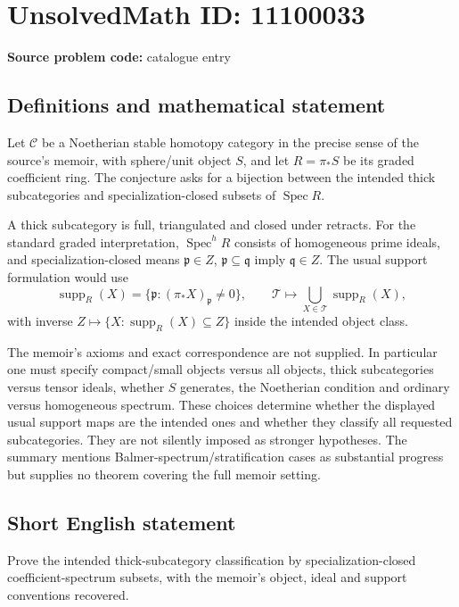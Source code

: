 \documentclass[11pt]{article}
\begin{document}
\section*{UnsolvedMath ID: 11100033}
\textbf{Source problem code:} catalogue entry
\subsection{Definitions and mathematical statement}
Let \(\mathcal C\) be a Noetherian stable homotopy category in the precise sense of the source's memoir, with sphere/unit object \(S\), and let \(R=\pi_*S\) be its graded coefficient ring. The conjecture asks for a bijection between the intended thick subcategories and specialization-closed subsets of \(\operatorname{Spec}R\).

A thick subcategory is full, triangulated and closed under retracts. For the standard graded interpretation, \(\operatorname{Spec}^hR\) consists of homogeneous prime ideals, and specialization-closed means \(\mathfrak p\in Z\), \(\mathfrak p\subseteq\mathfrak q\) imply \(\mathfrak q\in Z\). The usual support formulation would use
\[
 \operatorname{supp}_R(X)=\{\mathfrak p:(\pi_*X)_{\mathfrak p}\ne0\},
 \qquad
 \mathcal T\longmapsto\bigcup_{X\in\mathcal T}\operatorname{supp}_R(X),
\]
with inverse \(Z\mapsto\{X:\operatorname{supp}_R(X)\subseteq Z\}\) inside the intended object class.

The memoir's axioms and exact correspondence are not supplied. In particular one must specify compact/small objects versus all objects, thick subcategories versus tensor ideals, whether \(S\) generates, the Noetherian condition and ordinary versus homogeneous spectrum. These choices determine whether the displayed usual support maps are the intended ones and whether they classify all requested subcategories. They are not silently imposed as stronger hypotheses. The summary mentions Balmer-spectrum/stratification cases as substantial progress but supplies no theorem covering the full memoir setting.
\subsection{Short English statement}
Prove the intended thick-subcategory classification by specialization-closed coefficient-spectrum subsets, with the memoir's object, ideal and support conventions recovered.
\end{document}
